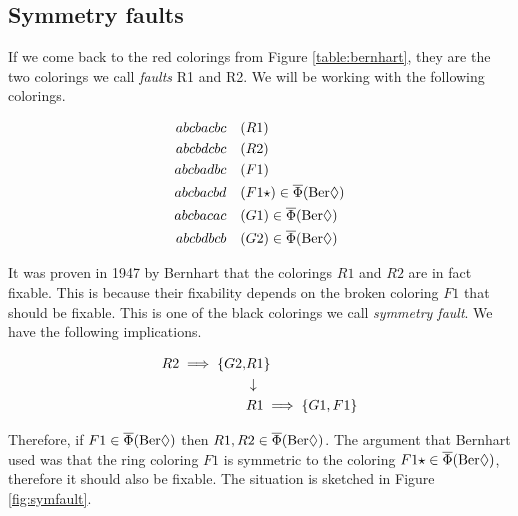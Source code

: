 \subsection{Symmetry faults}

If we come back to the red colorings from Figure \ref{table:bernhart}, they are the two colorings we call \textit{faults} R1 and R2. We will be working with the following colorings.

\begin{equation}
    \begin{aligned}
        abcbacbc &\quad (R1)\\
        abcbdcbc &\quad (R2)\\
        abcbadbc &\quad (F1)\\
        abcbacbd &\quad (F1\star)  \in \overline{\Phi}(\text{Ber}\Diamond)\\
        abcbacac &\quad (G1) \in \overline{\Phi}(\text{Ber}\Diamond) \\
        abcbdbcb &\quad (G2) \in \overline{\Phi}(\text{Ber}\Diamond) \\
    \end{aligned}
\end{equation}

It was proven in 1947 by Bernhart \cite{bernhart} that the colorings $R1$ and $R2$ are in fact fixable. This is because their fixability depends on the broken coloring $F1$ that should be fixable. This is one of the black colorings we call \textit{symmetry fault}. We have the following implications.

\begin{equation}
    \begin{aligned}
    R2 \implies \{ G2, &R1 \} \\
    &\downarrow \\
    &R1 \implies \{ G1, F1 \} \\
    \end{aligned}
\end{equation}

Therefore, if $F1 \in \overline{\Phi}(\text{Ber}\Diamond)$ then $R1, R2 \in \overline{\Phi}(\text{Ber}\Diamond)$. The argument that Bernhart used was that the ring coloring $F1$ is symmetric to the coloring $F1\star \in \overline{\Phi}(\text{Ber}\Diamond)$, therefore it should also be fixable. The situation is sketched in Figure \ref{fig:symfault}.


